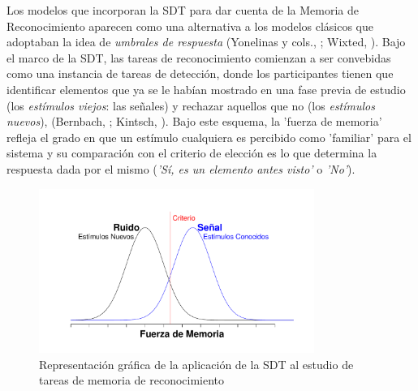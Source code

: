 
Los modelos que incorporan la SDT para dar cuenta de la Memoria de Reconocimiento aparecen como una alternativa a los modelos clásicos que adoptaban la idea de \textit{umbrales de respuesta} (Yonelinas y cols., \citeyear{Yonelinas1996}; Wixted, \citeyear{Wixted2007}). Bajo el marco de la SDT, las tareas de reconocimiento comienzan a ser convebidas como una instancia de tareas de detección, donde los participantes tienen que identificar elementos que ya se le habían mostrado en una fase previa de estudio (los \textit{estímulos viejos}: las señales) y rechazar aquellos que no (los \textit{estímulos nuevos}), (Bernbach, \citeyear{Bernbach1967}; Kintsch, \citeyear{Kintsch1967}). Bajo este esquema, la 'fuerza de memoria' refleja el grado en que un estímulo cualquiera es percibido como 'familiar' para el sistema y su comparación con el criterio de elección es lo que determina la respuesta dada por el mismo (\textit{'Sí, es un elemento antes visto'} o \textit{'No'}).\\ 

\begin{figure}[h]
\centering
\includegraphics[width=0.8\textwidth]{Figures/RM_SDT_1} 
\caption[SDT aplicada a tareas de memoria de reconocimiento]{Representación gráfica de la aplicación de la SDT al estudio de tareas de memoria de reconocimiento}
\label{fig:RM_SDT_1}
\end{figure}

